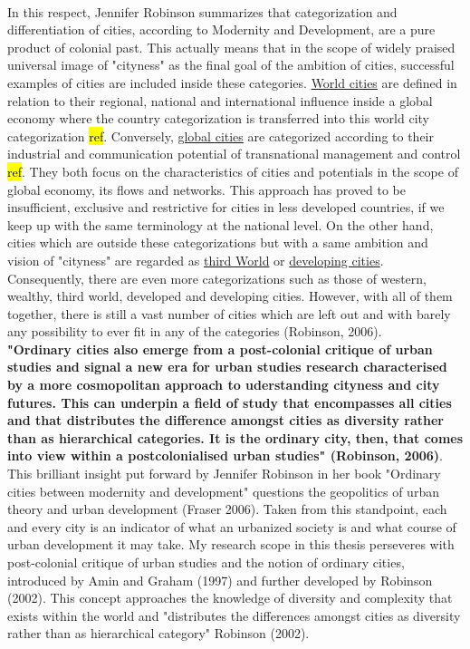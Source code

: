 \documentclass[11pt]{report}
\begin{document}
\\
In  this  respect,  Jennifer  Robinson  summarizes  that  categorization  and  differentiation  of  cities, according to Modernity and Development, are a pure product of colonial past. This actually means that in the scope of widely praised universal image of "cityness" as the final goal of the ambition of cities, successful examples of cities are included inside these categories. \underline{World cities} are defined in relation to their regional, national and international influence inside a global economy where the country categorization is transferred into this world city categorization \hl{ref}. Conversely, \underline{global cities} are categorized according to their industrial and communication potential of transnational management and control \hl{ref}. They both focus on the characteristics of cities and potentials in the scope of global economy, its flows and networks. This approach has proved to be insufficient, exclusive and restrictive for cities in less developed countries, if we keep up with the same terminology at the national level. On the other hand, cities which are outside these categorizations but with a same ambition and vision of "cityness" are regarded as \underline{third World} or \underline{developing cities}. Consequently, there are even more categorizations such as those of western, wealthy, third world, developed and developing cities. However, with all of them together, there is still a vast number of cities which are left out and with barely any possibility to ever fit in any of the categories (Robinson, 2006). 
\\
\textbf{"Ordinary cities also emerge from a post-colonial critique of urban studies and signal a new era for urban studies research characterised by a more cosmopolitan approach to uderstanding cityness and city futures. This can underpin a field of study that encompasses all cities and that distributes the difference amongst cities as diversity rather than as hierarchical categories. It is the ordinary city, then, that comes into view within a postcolonialised urban studies" (Robinson, 2006)}.
\\
This brilliant insight put forward by Jennifer Robinson in her book "Ordinary cities between modernity and development" questions the geopolitics of urban theory and urban development (Fraser 2006). Taken from this standpoint, each and every city is an indicator of what an urbanized society is and what course of urban development it may take. My research scope in this thesis perseveres with post-colonial critique of urban studies and the notion of ordinary cities, introduced by Amin and Graham (1997) and further developed by Robinson (2002). This concept approaches the knowledge of diversity and complexity that exists within the world and "distributes the differences amongst cities as diversity rather than as hierarchical category" Robinson (2002). 
\end{document}
